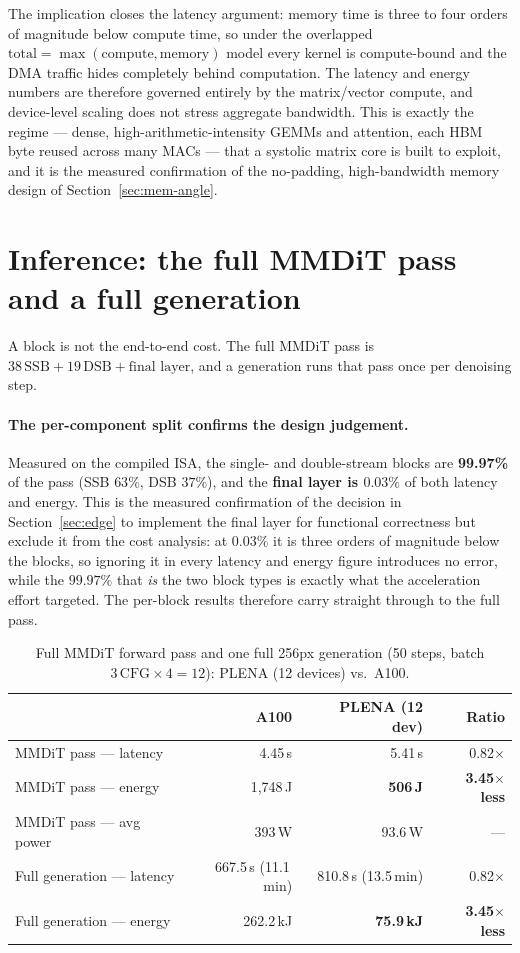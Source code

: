 \documentclass[11pt]{report}
\begin{document}
The implication closes the latency argument: memory time is three to four
orders of magnitude below compute time, so under the overlapped
$\text{total}=\max(\text{compute},\text{memory})$ model every kernel is
compute-bound and the DMA traffic hides completely behind computation. The
latency and energy numbers are therefore governed entirely by the
matrix/vector compute, and device-level scaling does not stress aggregate
bandwidth. This is exactly the regime --- dense, high-arithmetic-intensity
GEMMs and attention, each HBM byte reused across many MACs --- that a
systolic matrix core is built to exploit, and it is the measured
confirmation of the no-padding, high-bandwidth memory design of
Section~\ref{sec:mem-angle}.

\section{Inference: the full MMDiT pass and a full generation}
\label{sec:results-full}

A block is not the end-to-end cost. The full MMDiT pass is
$38\,\text{SSB} + 19\,\text{DSB} + \text{final layer}$, and a generation
runs that pass once per denoising step.

\paragraph{The per-component split confirms the design judgement.}
\label{sec:results-finallayer}
Measured on the compiled ISA, the single- and double-stream blocks are
\textbf{99.97\%} of the pass (SSB $63\%$, DSB $37\%$), and the
\textbf{final layer is $0.03\%$} of both latency and energy. This is the
measured confirmation of the decision in Section~\ref{sec:edge} to implement
the final layer for functional correctness but exclude it from the cost
analysis: at $0.03\%$ it is three orders of magnitude below the blocks, so
ignoring it in every latency and energy figure introduces no error, while the
$99.97\%$ that \emph{is} the two block types is exactly what the acceleration
effort targeted. The per-block results therefore carry straight through to
the full pass.

\begin{table}[h]
\centering
\caption{Full MMDiT forward pass and one full 256px generation (50 steps,
batch $3\,\text{CFG}\times4 = 12$): PLENA (12 devices) vs.\ A100.}
\label{tab:full-mmdit}
\begin{tabular}{@{}lrrr@{}}
\toprule
 & A100 & PLENA (12 dev) & Ratio \\
\midrule
MMDiT pass --- latency & 4.45\,s & 5.41\,s & 0.82$\times$ \\
MMDiT pass --- energy & 1{,}748\,J & \textbf{506\,J} & \textbf{3.45$\times$ less} \\
MMDiT pass --- avg power & 393\,W & 93.6\,W & --- \\
\midrule
Full generation --- latency & 667.5\,s (11.1\,min) & 810.8\,s (13.5\,min) & 0.82$\times$ \\
Full generation --- energy & 262.2\,kJ & \textbf{75.9\,kJ} & \textbf{3.45$\times$ less} \\
\bottomrule
\end{tabular}
\end{table}
\end{document}
